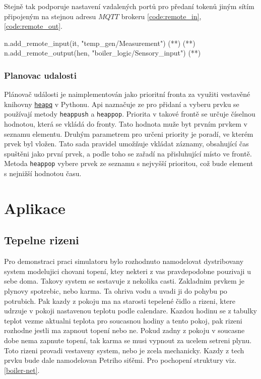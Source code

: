 Stejně tak podporuje nastavení vzdalených portů pro předaní tokenů jiným sítím připojeným na stejnou adresu $MQTT$ brokeru \ref{code:remote_in}, \ref{code:remote_out}.

\begin{python}
  n.add_remote_input(it, "temp_gen/Measurement") (*\label{code:remote_in}*) (*\label{code:remote-in-out}*)
  n.add_remote_output(hen, "boiler_logic/Sensory_input") (*\label{code:remote_out}*)
\end{python}


\subsection{Planovac udalosti}
\label{subsec:event-planner}
Plánovač události je naimplementován jako prioritní fronta za využiti vestavěné knihovny \href{https://docs.python.org/3/library/heapq.html}{\texttt{heapq}} v Pythonu. Api naznačuje ze pro přidaní a vyberu prvku se používají metody \texttt{heappush} a \texttt{heappop}. Priorita v takové frontě se určuje číselnou hodnotou, která se vkládá do fronty. Tato hodnota muže byt prvním prvkem v seznamu elementu. Druhým parametrem pro určeni priority je poradí, ve kterém prvek byl vložen. Tato sada pravidel umožňuje vkládat záznamy, obsahující čas spuštěni jako první prvek, a podle toho se zařadí na přisluhující místo ve frontě. Metoda \texttt{heappop} vybere prvek ze seznamu s nejvyšší prioritou, což bude element s nejnižší hodnotou času.


\chapter{Aplikace}

\section{Tepelne rizeni}
\label{sec:tepelne-rizeni}
Pro demonstraci praci simulatoru bylo rozhodnuto namodelovat dystribovany system modelujici chovani topení, ktey nekteri z vas pravdepodobne pouzivaji u sebe doma. Takovy system se sestavuje z nekolika casti. Zakladnim prvkem je plynovy spotrebic, nebo karma. Ta ohriva vodu a uvadi ji do pohybu po potrubich. Pak kazdy z pokoju ma na starosti tepelené čidlo a rizeni, ktere udrzuje v pokoji nastavenou teplotu podle calendare. Kazdou hodinu se z tabulky teplot vezme aktualni teplota pro soucasnou hodiny a tento pokoj, pak rizeni rozhodne jestli ma zapnout topení nebo ne. Pokud zadny z pokoju v soucasne dobe nema zapnute topení, tak karma se musi vypnout za ucelem setreni plynu. Toto rizeni provadi vestaveny system, nebo je zcela mechanicky. Kazdy z tech prvku bude dale namodelovan Petriho siťěmi. Pro pochopení struktury viz. \ref{boiler-net}.

